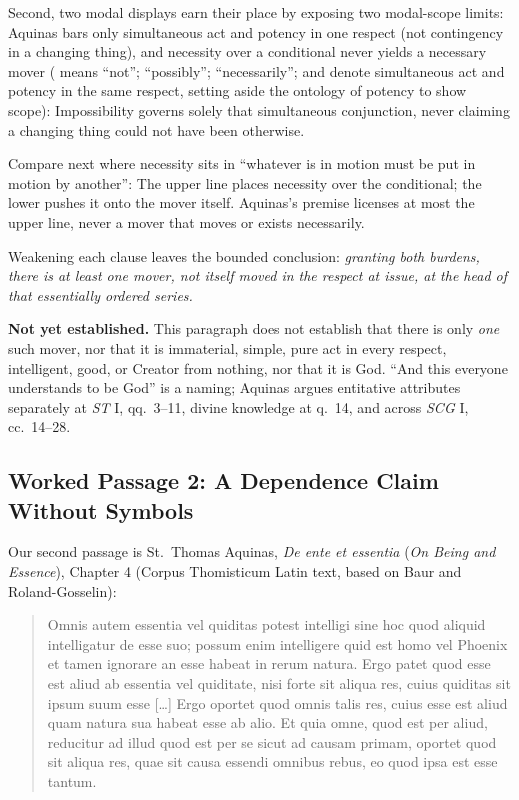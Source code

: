 Second, two modal displays earn their place by exposing two modal-scope limits: Aquinas bars only simultaneous act and potency in one respect (not contingency in a changing thing), and necessity over a conditional never yields a necessary mover (\linline{\lneg} means ``not''; \linline{\ldiam} ``possibly''; \linline{\lbox} ``necessarily'';  and  denote simultaneous act and potency in the same respect, setting aside the ontology of potency to show scope):
Impossibility governs solely that simultaneous conjunction, never claiming a changing thing could not have been otherwise.

\keeppair
Compare next where necessity sits in ``whatever is in motion must be put in motion by another'':
The upper line places necessity over the conditional; the lower pushes it onto the mover itself. Aquinas's premise licenses at most the upper line, never a mover that moves or exists necessarily.

Weakening each clause leaves the bounded conclusion: \emph{granting both burdens, there is at least one mover, not itself moved in the respect at issue, at the head of that essentially ordered series.}

\textbf{Not yet established.} This paragraph does not establish that there is only \emph{one} such mover, nor that it is immaterial, simple, pure act in every respect, intelligent, good, or Creator from nothing, nor that it is God. ``And this everyone understands to be God'' is a naming; Aquinas argues entitative attributes separately at \emph{ST} I, qq.\ 3--11, divine knowledge at q.\ 14, and across \emph{SCG} I, cc.\ 14--28.

\subsection{Worked Passage 2: A Dependence Claim Without Symbols}

Our second passage is St.\ Thomas Aquinas, \emph{De ente et essentia} (\emph{On Being and Essence}), Chapter 4 (Corpus Thomisticum Latin text, based on Baur and Roland-Gosselin):

\begin{quote}
Omnis autem essentia vel quiditas potest intelligi sine hoc quod aliquid intelligatur de esse suo; possum enim intelligere quid est homo vel Phoenix et tamen ignorare an esse habeat in rerum natura. Ergo patet quod esse est aliud ab essentia vel quiditate, nisi forte sit aliqua res, cuius quiditas sit ipsum suum esse [\dots] Ergo oportet quod omnis talis res, cuius esse est aliud quam natura sua habeat esse ab alio. Et quia omne, quod est per aliud, reducitur ad illud quod est per se sicut ad causam primam, oportet quod sit aliqua res, quae sit causa essendi omnibus rebus, eo quod ipsa est esse tantum.
\end{quote}

